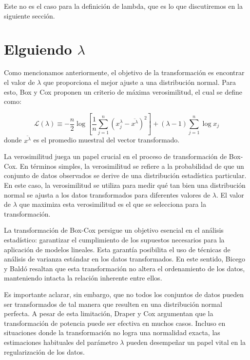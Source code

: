     Este no es el caso para la definici\'on de lambda, que es lo que discutiremos en la siguiente secci\'on.

    \section[eliguiendo lambda]{Elguiendo $\lambda$}

    Como mencionamos anteriormente, el objetivo de la transformaci\'on es encontrar el valor de $\lambda$ que proporciona el mejor ajuste a una distribuci\'on normal. Para esto, Box y Cox proponen un criterio de m\'axima verosimilitud, el cual se define como:

    \begin{equation}
        \mathcal{L}(\lambda) \equiv-\frac{n}{2} \log \left[\frac{1}{n} \sum_{j=1}^{n}\left(x_{j}^{\lambda}-\overline{x^{\lambda}}\right)^{2}\right] +(\lambda-1) \sum_{j=1}^{n} \log x_{j}
    \end{equation}
    donde $\overline{x^{\lambda}}$ es el promedio muestral del vector transformado.

    La verosimilitud juega un papel crucial en el proceso de transformaci\'on de Box-Cox. En t\'erminos simples, la verosimilitud se refiere a la probabilidad de que un conjunto de datos observados se derive de una distribuci\'on estad\'istica particular. En este caso, la verosimilitud se utiliza para medir qu\'e tan bien una distribuci\'on normal se ajusta a los datos transformados para diferentes valores de $\lambda$. El valor de $\lambda$ que maximiza esta verosimilitud es el que se selecciona para la transformaci\'on.

    
    La transformaci\'on de Box-Cox persigue un objetivo esencial en el an\'alisis estad\'istico: garantizar el cumplimiento de los supuestos necesarios para la aplicaci\'on de modelos lineales. Esta garant\'ia posibilita el uso de t\'ecnicas de an\'alisis de varianza est\'andar en los datos transformados. En este sentido, Bicego y Bald\'o \cite{bicego2016} resaltan que esta transformaci\'on no altera el ordenamiento de los datos, manteniendo intacta la relaci\'on inherente entre ellos.

    Es importante aclarar, sin embargo, que no todos los conjuntos de datos pueden ser transformados de tal manera que resulten en una distribuci\'on normal perfecta. A pesar de esta limitaci\'on, Draper y Cox \cite{draper1969}argumentan que la transformaci\'on de potencia puede ser efectiva en muchos casos. Incluso en situaciones donde la transformaci\'on no logra una normalidad exacta, las estimaciones habituales del par\'ametro $\lambda$ pueden desempe\~nar un papel vital en la regularizaci\'on de los datos.

